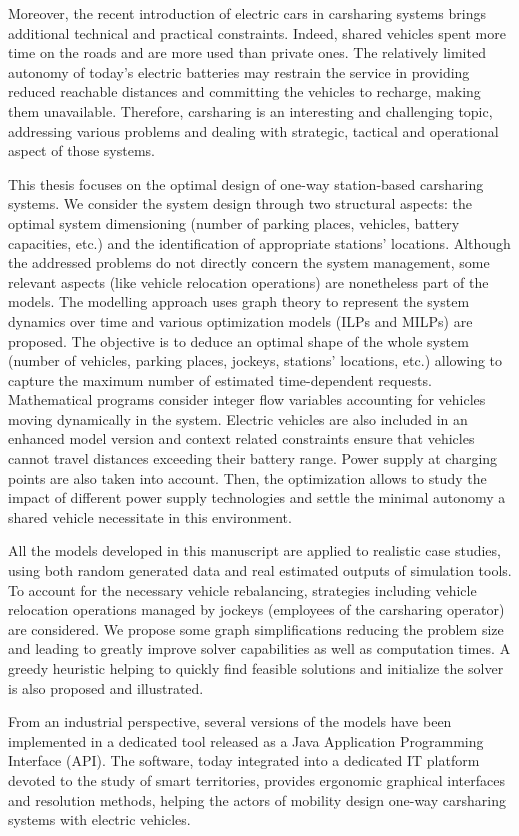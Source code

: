 \medskip
Moreover, the recent introduction of electric cars in carsharing systems brings additional technical and practical constraints.
Indeed, shared vehicles spent more time on the roads and are more used than private ones.
The relatively limited autonomy of today's electric batteries may restrain the service in providing  reduced reachable distances and committing the vehicles to recharge, making them unavailable.
Therefore, carsharing is an interesting and challenging topic, addressing various problems and dealing with strategic, tactical and operational aspect of those systems.

\medskip
This thesis focuses on the optimal design of one-way station-based carsharing systems.
We consider the system design through two structural aspects: the optimal system dimensioning (number of parking places, vehicles, battery capacities, etc.) and the identification of appropriate stations' locations.
Although the addressed problems do not directly concern the system management, some relevant aspects (like vehicle relocation operations) are nonetheless part of the models.
The modelling approach uses graph theory to represent the system dynamics over time and various optimization models (ILPs and MILPs) are proposed.
The objective is to deduce an optimal shape of the whole system (number of vehicles, parking places, jockeys, stations' locations, etc.) allowing to capture the maximum number of estimated time-dependent requests.
Mathematical programs consider integer flow variables accounting for vehicles moving dynamically in the system.
Electric vehicles are also included in an enhanced model version and context related constraints ensure that vehicles cannot travel distances exceeding their battery range.
Power supply at charging points are also taken into account.
Then, the optimization allows to study the impact of different power supply technologies and settle the minimal autonomy a shared vehicle necessitate in this environment.

\medskip
All the models developed in this manuscript are applied to realistic case studies, using both random generated data and real estimated outputs of simulation tools.
To account for the necessary vehicle rebalancing, strategies including vehicle relocation operations managed by jockeys (employees of the carsharing operator) are considered.
We propose some graph simplifications reducing the problem size and leading to greatly improve solver capabilities as well as computation times.
A greedy heuristic helping to quickly find feasible solutions and initialize the solver is also proposed and illustrated.

\medskip
From an industrial perspective, several versions of the models have been implemented in a dedicated tool released as a Java Application Programming Interface (API).
The software, today  integrated into a dedicated IT platform devoted to the study of smart territories, provides ergonomic graphical interfaces and resolution methods, helping the actors of mobility design one-way carsharing systems with electric vehicles.
